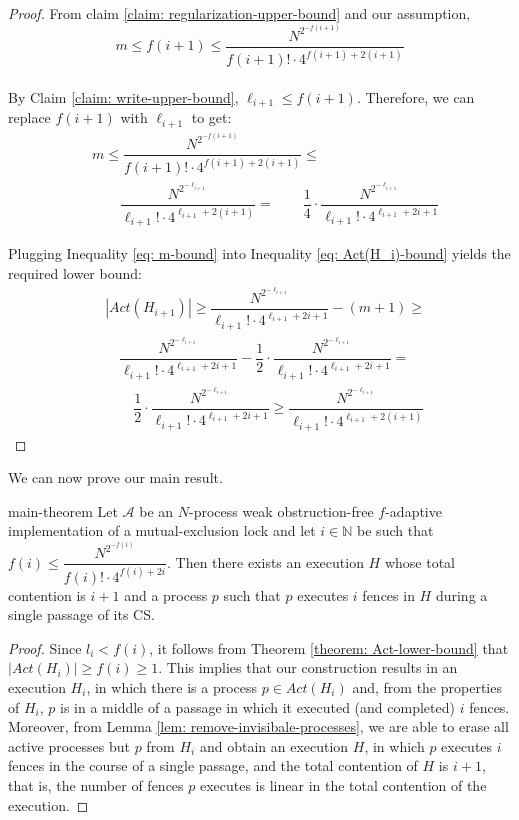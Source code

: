 \begin{proof}
	From claim \ref{claim: regularization-upper-bound} and our assumption,
	$$m \leq f(i+1) \leq \dfrac{N^{2^{-f(i+1)}}} {f(i+1)! \cdot 4^{f(i+1) + 2(i+1)}}$$
	\\ By Claim \ref{claim: write-upper-bound}, $\ell_{i+1} \leq f(i+1)$. Therefore, we can replace $f(i+1)$ with $\ell_{i+1}$ to get:
	\begin{equation} \label{eq: m-bound}
		\begin{aligned}
			& m \leq \dfrac{N^{2^{-f(i+1)}}} {f(i+1)! \cdot 4^{f(i+1) + 2(i+1)}} \leq \\
			& \qquad \dfrac{N^{2^{-\ell_{i+1}}}} {\ell_{i+1}! \cdot 4^{\ell_{i+1} + 2(i+1)}} = \qquad \dfrac{1}{4} \cdot \dfrac{N^{2^{-\ell_{i+1}}}} {\ell_{i+1}! \cdot 4^{\ell_{i+1}+2i+1}}
		\end{aligned}
	\end{equation}
	
	
	Plugging Inequality \ref{eq: m-bound} into Inequality \ref{eq: Act(H_i)-bound} yields the required lower bound:
	\begin{align*}
		& |Act(H_{i+1})| \geq
		\dfrac{N^{2^{-\ell_{i+1}}}} {\ell_{i+1}! \cdot 4^{\ell_{i+1}+2i+1}}-(m+1) \geq \\
		& \quad \dfrac{N^{2^{-\ell_{i+1}}}} {\ell_{i+1}! \cdot 4^{\ell_{i+1}+2i+1}}-\dfrac{1}{2} \cdot \dfrac{N^{2^{-\ell_{i+1}}}} {\ell_{i+1}! \cdot 4^{\ell_{i+1}+2i+1}} = \\
		& \qquad \dfrac{1}{2} \cdot \dfrac{N^{2^{-\ell_{i+1}}}} {\ell_{i+1}! \cdot 4^{\ell_{i+1}+2i+1}} \geq
		\dfrac{N^{2^{-\ell_{i+1}}}} {\ell_{i+1}! \cdot 4^{\ell_{i+1}+2(i+1)}}
	\end{align*}
\end{proof}

We can now prove our main result.

\begin{theorem-repeat} {main-theorem}
	Let $\mathcal{A}$ be an $N$-process weak obstruction-free $f$-adaptive implementation of a mutual-exclusion lock and let $i \in \mathbb{N}$ be such that $f(i) \leq \dfrac{N^{2^{-f(i)}}} {f(i)! \cdot 4^{f(i)+2i}}$.
	Then there exists an execution $H$ whose total contention is $i+1$ and a process $p$ such that $p$ executes $i$ fences in $H$ during a single passage of its CS.\end{theorem-repeat}

\begin{proof}
Since $l_i < f(i)$, it follows from Theorem \ref{theorem: Act-lower-bound} that $|Act(H_i)| \geq f(i) \geq 1$. This implies that our construction results in an execution $H_i$, in which there is a process $p \in Act(H_i)$ and, from the properties of $H_i$, $p$ is in a middle of a passage in which it executed (and completed) $i$ fences.
Moreover, from Lemma \ref{lem: remove-invisibale-processes}, we are able to erase all active processes but $p$ from $H_i$ and obtain an execution $H$, in which $p$ executes $i$ fences in the course of a single passage, and the total contention of $H$ is $i+1$, that is, the number of fences $p$ executes is linear in the total contention of the execution.
\end{proof}


